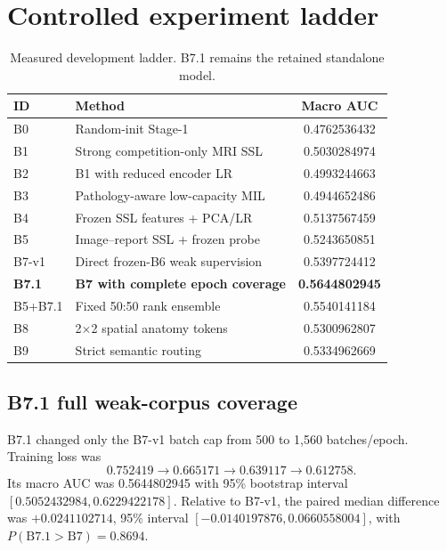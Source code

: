 \documentclass[preprint,12pt]{elsarticle}
\begin{document}
\section{Controlled experiment ladder}
\label{sec:experiments}

\begin{table}[ht]
\centering
\caption{Measured development ladder. B7.1 remains the retained standalone model.}
\label{tab:ladder}
\begin{tabular}{llc}
\toprule
ID & Method & Macro AUC \\
\midrule
B0 & Random-init Stage-1 & 0.4762536432 \\
B1 & Strong competition-only MRI SSL & 0.5030284974 \\
B2 & B1 with reduced encoder LR & 0.4993244663 \\
B3 & Pathology-aware low-capacity MIL & 0.4944652486 \\
B4 & Frozen SSL features + PCA/LR & 0.5137567459 \\
B5 & Image--report SSL + frozen probe & 0.5243650851 \\
B7-v1 & Direct frozen-B6 weak supervision & 0.5397724412 \\
\textbf{B7.1} & \textbf{B7 with complete epoch coverage} & \textbf{0.5644802945} \\
B5+B7.1 & Fixed 50:50 rank ensemble & 0.5540141184 \\
B8 & 2$\times$2 spatial anatomy tokens & 0.5300962807 \\
B9 & Strict semantic routing & 0.5334962669 \\
\bottomrule
\end{tabular}
\end{table}

\subsection{B7.1 full weak-corpus coverage}
B7.1 changed only the B7-v1 batch cap from 500 to 1,560 batches/epoch. Training loss was
\begin{equation*}
0.752419\rightarrow0.665171\rightarrow0.639117\rightarrow0.612758.
\end{equation*}
Its macro AUC was 0.5644802945 with 95\% bootstrap interval $[0.5052432984,0.6229422178]$. Relative to B7-v1, the paired median difference was $+0.0241102714$, 95\% interval $[-0.0140197876,0.0660558004]$, with $P(\mathrm{B7.1}>\mathrm{B7})=0.8694$.
\end{document}
